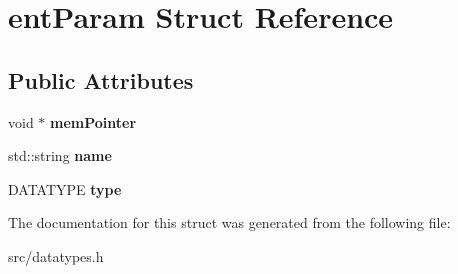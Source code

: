\hypertarget{structent_param}{
\section{entParam Struct Reference}
\label{structent_param}
}
\subsection*{Public Attributes}
\begin{DoxyCompactItemize}
\item 
\hypertarget{structent_param_a65f11d247a04ad2cca85a2ba0ef6e5df}{
void $\ast$ {\bfseries memPointer}}
\label{structent_param_a65f11d247a04ad2cca85a2ba0ef6e5df}

\item 
\hypertarget{structent_param_aaec0219278075d5cae2e458ffecbe75b}{
std::string {\bfseries name}}
\label{structent_param_aaec0219278075d5cae2e458ffecbe75b}

\item 
\hypertarget{structent_param_a85f8333383325bf46fa7f20d44d86bfe}{
DATATYPE {\bfseries type}}
\label{structent_param_a85f8333383325bf46fa7f20d44d86bfe}

\end{DoxyCompactItemize}


The documentation for this struct was generated from the following file:\begin{DoxyCompactItemize}
\item 
src/datatypes.h\end{DoxyCompactItemize}
